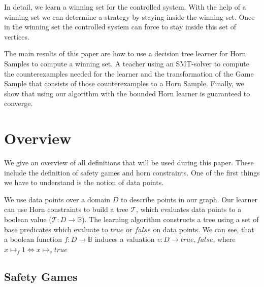 \documentclass[10pt,a4paper]{article}
\theoremstyle{plain}
\theoremstyle{definition}
\begin{document}
In detail, we learn a winning set for the controlled system.  With the help of a winning set we can determine a strategy by staying inside the winning set. Once in the winning set the controlled system can force to stay inside this set of vertices. 

The main results of this paper are how to use a decision tree learner for Horn Samples to compute a winning set. A teacher using an SMT-solver to compute the counterexamples needed for the learner and the transformation of the Game Sample that consists of those counterexamples to a Horn Sample. Finally, we show that using our algorithm with the bounded Horn learner is guaranteed to converge.



\section{Overview}
We give an overview of all definitions that will be used during this paper. These include the definition of safety games and horn constraints. One of the first things we have to understand is the notion of data points.
 
We use data points over a domain $D$ to describe points in our graph. Our learner can use Horn constraints to build a tree $\mathcal{T}$, which evaluates data points to a boolean value ($\mathcal{T}:D \to \mathbb{B}$). The learning algorithm constructs a tree using a set of base predicates which evaluate to $true$ or $false$ on data points.
We can see, that a boolean function $f: D \to \mathbb{B}$ induces a valuation $v: D \to {true,false}$, where $x \mapsto_f 1 \iff x\mapsto_v true$
\subsection{Safety Games}
\end{document}
